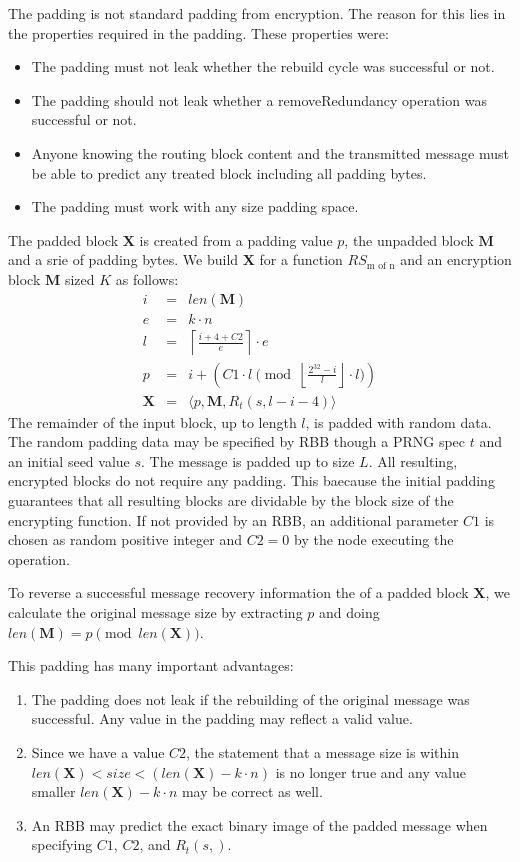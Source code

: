 \documentclass[10pt,journal,compsoc,twocolumn,twoside]{IEEEtran}
\begin{document}
The padding is not standard padding from encryption. The reason for this lies in the properties required in the padding. These properties were:
\begin{itemize}
	\item The padding must not leak whether the rebuild cycle was successful or not.
	\item The padding should not leak whether a removeRedundancy operation was successful or not. 
	\item Anyone knowing the routing block content and the transmitted message must be able to predict any treated block including all padding bytes.
	\item The padding must work with any size padding space.
\end{itemize}

The padded block $\mathbf{X}$ is created from a padding value $p$, the unpadded block $\mathbf{M}$ and a srie of padding bytes. We build $\mathbf{X}$ for a function $RS_{\text{m of n}}$ and an encryption block $\mathbf{M}$ sized $K$ as follows:
\begin{eqnarray}
i          & = & len(\mathbf{M})\\
e          & = & k \cdot n\\
l          & = & \left\lceil\frac{i + 4 + C2 }{e}\right\rceil\cdot e\\
p          & = & i + \left( C1 \cdot l \pmod{\left\lfloor\frac{2^{32}-i}{l}\right\rfloor\cdot l}\right)\\
\mathbf{X} & = & \langle p,\mathbf{M},R_{t}\left(s,l-i-4\right)\rangle
\end{eqnarray}    
The remainder of the input block, up to length $l$, is padded with random data. The random padding data may be specified by RBB though a PRNG spec $t$ and an initial seed value $s$. The message is padded up to size $L$. All resulting, encrypted blocks do not require any padding. This baecause the initial padding guarantees that all resulting blocks are dividable by the block size of the encrypting function. If not provided by an RBB, an additional parameter $C1$ is chosen as random positive integer and $C2=0$  by the node executing the operation.

To reverse a successful message recovery information the of a padded block $\mathbf{X}$, we calculate the original message size by extracting $p$ and doing $len(\mathbf{M})=p \pmod{ len(\mathbf{X})}$.

This padding has many important advantages:
\begin{enumerate}
	\item The padding does not leak if the rebuilding of the original message was successful. Any value in the padding may reflect a valid value.
	\item Since we have a value $C2$, the statement that a message size is within $len(\mathbf{X})<size<(len(\mathbf{X})-k\cdot n)$ is no longer true and any value smaller $len(\mathbf{X})-k\cdot n$ may be correct as well.
	\item An RBB may predict the exact binary image of the padded message when specifying $C1$, $C2$, and $R_{t}(s,)$.
\end{enumerate}
\end{document}

